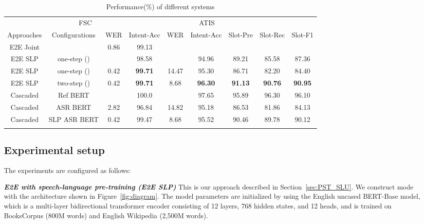 \documentclass{article}
\begin{document}
\begin{table*}
\centering
\caption{Performance(\%) of different systems}
\smallskip
\renewcommand{\arraystretch}{1.3}
\label{tab:performance}       \begin{tabular}{cc|cc|ccccc}
\hline \hline\noalign{\smallskip}
\multicolumn{2}{c|}{Systems} & \multicolumn{2}{c|}{FSC } & \multicolumn{5}{c}{ATIS}\\
 Approaches & Configurations  & WER & Intent-Acc & WER & Intent-Acc & Slot-Pre & Slot-Rec & Slot-F1  \\
\noalign{\smallskip}\hline
E2E Joint &    & 0.86    & 99.13     &  & &&   & \\
\noalign{\smallskip}\hline\noalign{\smallskip}
E2E SLP & one-step () &    &    98.58 &     & 94.96 & 89.21 & 85.58 & 87.36\\
E2E SLP & one-step () & 0.42   & \textbf{99.71}   & 14.47 & 95.30 & 86.71 & 82.20 & 84.40 \\
E2E SLP & two-step () & 0.42   &  \textbf{99.71}  &   8.68    &  \textbf{96.30} & \textbf{91.13}  & \textbf{90.76} & \textbf{90.95}\\
\noalign{\smallskip}\hline
Cascaded & Ref  BERT  &    &  100.0   &  & 97.65 & 95.89 & 96.30 & 96.10 \\
Cascaded & ASR  BERT   & 2.82  & 96.84   & 14.82 & 95.18 & 86.53  & 81.86 & 84.13 \\
Cascaded & SLP ASR  BERT  & 0.42 &  99.47  &  8.68 & 95.52 & 90.46 & 89.78 & 90.12 \\
\noalign{\smallskip}\hline\hline
\end{tabular}
\end{table*}


\subsection{Experimental setup}
\label{ssec:Setup}

The experiments are configured as follows:

\textit{\textbf{E2E with speech-language pre-training (E2E SLP)}} This is our approach described in Section~\ref{sec:PST_SLU}. We construct mode with the architecture shown in Figure~\ref{fig:diagram}. The model parameters are initialized by using the English uncased BERT-Base model, which is a multi-layer bidirectional transformer encoder consisting of 12 layers, 768 hidden states, and 12 heads, and is trained on  BooksCorpus (800M words) and English Wikipedia (2,500M words). 
\end{document}
